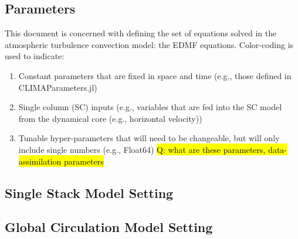 \documentclass{report}
\begin{document}
\subsection{Parameters}

This document is concerned with defining the set of equations solved in the atmospheric turbulence convection model: the EDMF equations. Color-coding is used to indicate:

\begin{enumerate} 
\item Constant parameters that are fixed in space and time (e.g., those defined in CLIMAParameters.jl)
\item Single column (SC) inputs (e.g., variables that are fed into the SC model from the dynamical core (e.g., horizontal velocity))
\item Tunable hyper-parameters that will need to be changeable, but will only include single numbers (e.g., Float64)
\hl{Q: what are these parameters, data-assimilation parameters}
\end{enumerate}






\subsection{Single Stack Model Setting} \label{sec:Single Stack setting}


\subsection{Global Circulation Model Setting} \label{sec:Global Circulation Model Setting}

\appendix



\end{document}
